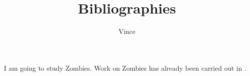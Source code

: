 \documentclass{article}
\title{Bibliographies}
\author{Vince}
\begin{document}
\maketitle

I am going to study Zombies.
Work on Zombies has already been carried out in \cite{munz2009zombies}.



\end{document}
